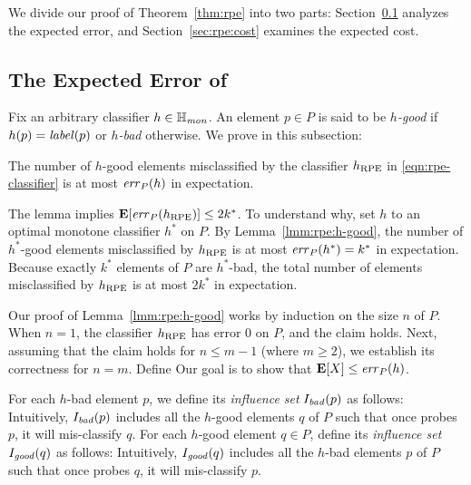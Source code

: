 We divide our proof of Theorem~\ref{thm:rpe} into two parts: Section~\ref{sec:rpe:error} analyzes the expected error, and Section~\ref{sec:rpe:cost} examines the expected cost.

\subsection{The Expected Error of } \label{sec:rpe:error}

Fix an arbitrary classifier $h \in \mathbb{H}_\mathit{mon}$. An element $p \in P$ is said to be {\em $h$-good} if $h(p) = \mathit{label}(p)$ or {\em $h$-bad} otherwise. We  prove in this subsection:

\begin{lemma} \label{lmm:rpe:h-good}
    The number of $h$-good elements misclassified by the classifier $h_{\mathrm{RPE}}$ in \eqref{eqn:rpe-classifier} is at most $\mathit{err}_P(h)$ in expectation.
\end{lemma}

The lemma implies $\operatorname*{\mathbf{E}}[\mathit{err}_P(h_{\mathrm{RPE}})] \le 2k^*$. To understand why, set $h$ to an optimal monotone classifier $h^*$ on $P$. By Lemma~\ref{lmm:rpe:h-good}, the number of $h^*$-good elements misclassified by $h_{\mathrm{RPE}}$ is at most $\mathit{err}_P(h^*) = k^*$ in expectation. Because exactly $k^*$ elements of $P$ are $h^*$-bad, the total number of elements misclassified by $h_{\mathrm{RPE}}$ is at most $2k^*$ in expectation.

\vgap

Our proof of Lemma~\ref{lmm:rpe:h-good} works by induction on the size $n$ of $P$. When $n = 1$, the classifier $h_{\mathrm{RPE}}$ has error 0 on $P$, and the claim holds. Next, assuming that the claim holds for $n \le m - 1$ (where $m \ge 2$), we establish its correctness for $n = m$. Define
    Our goal is to show that $\operatorname*{\mathbf{E}}[X] \le \mathit{err}_P(h)$.

    \vgap

    For each $h$-bad element $p$, we define its {\em influence set} $I_\mathit{bad}(p)$ as follows:
    {Intuitively, $I_\mathit{bad}(p)$ includes all the $h$-good elements $q$ of $P$ such that once  probes $p$, it will mis-classify $q$.} For each $h$-good element $q \in P$, define its {\em influence set} $I_\mathit{good}(q)$ as follows:
    {Intuitively, $I_\mathit{good}(q)$ includes all the $h$-bad elements $p$ of $P$ such that once  probes $q$, it will mis-classify $p$.}


